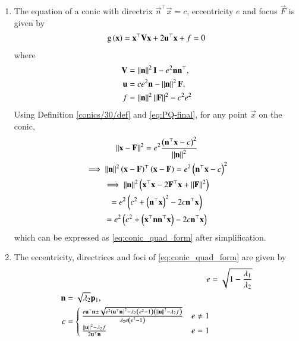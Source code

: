 \begin{enumerate}[label=\thesubsection.\arabic*.,ref=\thesubsection.\theenumi]
\item
The equation of  a conic with directrix $\vec{n}^{\top}\vec{x} = c$, eccentricity $e$ and focus $\vec{F}$ is given by 
\begin{align}
    \label{eq:conic_quad_form}
	\text{g}\left(\mathbf{x}\right) = \mathbf{x}^{\top}\mathbf{V}\mathbf{x}+2\mathbf{u}^{\top}\mathbf{x}+f=0
    \end{align}
where     
\begin{align}
  \label{eq:conic_quad_form_v}
\mathbf{V} &=\left\lVert\mathbf{n}\right\rVert^2\mathbf{I}-e^2\mathbf{n}\mathbf{n}^{\top}, 
\\
\label{eq:conic_quad_form_u}
\mathbf{u} &= ce^2\mathbf{n}-\left\lVert\mathbf{n}\right\rVert^2\mathbf{F}, 
\\
\label{eq:conic_quad_form_f}
f &= \left\lVert\mathbf{n}\right\rVert^2\left\lVert\mathbf{F}\right\rVert^2-c^2e^2
    \end{align}
    \solution
  Using Definition \ref{conics/30/def} and 
			\eqref{eq:PQ-final},
for any point $\vec{x}$ on the conic,
\begin{multline}
\left\lVert\mathbf{x}-\mathbf{F}\right\rVert^2=e^2 \frac{\left({\mathbf{n}^{\top}\mathbf{x} - c}\right)^2}{\left\lVert\mathbf{n}\right\rVert^2}\label{conics/30/eq:1} \\
\implies \left\lVert\mathbf{n}\right\rVert^2\left(\mathbf{x}-\mathbf{F}\right)^{\top}\left(\mathbf{x}-\mathbf{F}\right)=e^2\left(\mathbf{n}^{\top}\mathbf{x} - c\right)^2
\\
\implies \left\lVert\mathbf{n}\right\rVert^2\left(\mathbf{x}^{\top}\mathbf{x}-2\mathbf{F}^{\top}\mathbf{x}+\left\lVert\mathbf{F}\right\rVert^2\right)
	\\
	=e^2\left(c^2+\left(\mathbf{n}^{\top}\mathbf{x} \right)^2-2c\mathbf{n}^{\top}\mathbf{x}\right) \\
=e^2\left(c^2+\left(\mathbf{x}^{\top}\mathbf{n}\mathbf{n}^{\top}\mathbf{x} \right)-2c\mathbf{n}^{\top}\mathbf{x}\right)
\end{multline}
%
which can be expressed as \eqref{eq:conic_quad_form} after simplification.
\item
  The eccentricity, directrices and foci of \eqref{eq:conic_quad_form} are given by 
\begin{align}
  \label{eq:conic_quad_form_e} 
  e&= \sqrt{1-\frac{\lambda_1}{\lambda_2}}
\\
\label{eq:conic_quad_form_nc} 
	\begin{split}
  \mathbf{n}&= \sqrt{\lambda_2}\mathbf{p}_1,  
  \\
	c &= 
  \begin{cases}
    \frac{e\mathbf{u}^{\top}\mathbf{n} \pm \sqrt{e^2\left(\mathbf{u}^{\top}\mathbf{n}\right)^2-\lambda_2\left(e^2-1\right)\left(\left\lVert\mathbf{u}\right\rVert^2 - \lambda_2 f\right)}}{\lambda_2e\left(e^2-1\right)} & e \ne 1
    \\
    \frac{\left\lVert\mathbf{u}\right\rVert^2 - \lambda_2 f   }{2\mathbf{u}^{\top}\mathbf{n}} & e = 1

\end{cases}
\end{split}
\end{align}
\end{enumerate}
